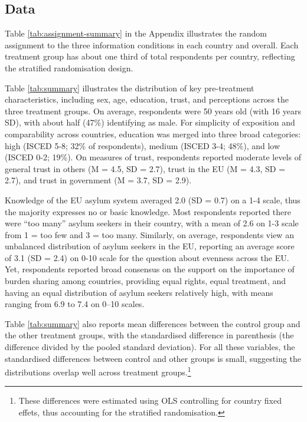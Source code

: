 \documentclass[
  12pt,
  a4paper,
]{article}
\begin{document}
\subsection{Data}\label{data}

Table \ref{tab:assignment-summary} in the Appendix illustrates the random assignment to the three information conditions in each country and overall. Each treatment group has about one third of total respondents per country, reflecting the stratified randomisation design.

Table \ref{tab:summary} illustrates the distribution of key pre-treatment characteristics, including sex, age, education, trust, and perceptions across the three treatment groups. On average, respondents were 50 years old (with 16 years SD), with about half (47\%) identifying as male. For simplicity of exposition and comparability across countries, education was merged into three broad categories: high (ISCED 5-8; 32\% of respondents), medium (ISCED 3-4; 48\%), and low (ISCED 0-2; 19\%). On measures of trust, respondents reported moderate levels of general trust in others (M = 4.5, SD = 2.7), trust in the EU (M = 4.3, SD = 2.7), and trust in government (M = 3.7, SD = 2.9).

Knowledge of the EU asylum system averaged 2.0 (SD = 0.7) on a 1-4 scale, thus the majority expresses no or basic knowledge. Most respondents reported there were ``too many'' asylum seekers in their country, with a mean of 2.6 on 1-3 scale from 1 = too few and 3 = too many. Similarly, on average, respondents view an unbalanced distribution of asylum seekers in the EU, reporting an average score of 3.1 (SD = 2.4) on 0-10 scale for the question about evenness across the EU. Yet, respondents reported broad consensus on the support on the importance of burden sharing among countries, providing equal rights, equal treatment, and having an equal distribution of asylum seekers relatively high, with means ranging from 6.9 to 7.4 on 0--10 scales.

Table \ref{tab:summary} also reports mean differences between the control group and the other treatment groups, with the standardised difference in parenthesis (the difference divided by the pooled standard deviation). For all these variables, the standardised differences between control and other groups is small, suggesting the distributions overlap well across treatment groups.\footnote{
  These differences were estimated using OLS controlling for country fixed effets, thus accounting for the stratified randomisation.}
\end{document}
